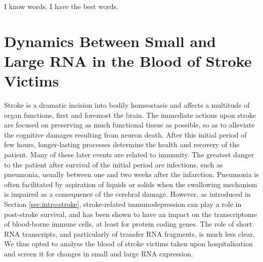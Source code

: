 \newpage\null\pagestyle{plain}\newpage

\pagestyle{fancy}
\fancyhf{}
\renewcommand{\sectionmark}[1]{\markright{#1}} %
\fancyhead[le,ro]{\nouppercase{\rightmark}}
\fancyfoot[le,ro]{\thepage}
\renewcommand{\headrulewidth}{.4pt}
\renewcommand{\footrulewidth}{.4pt}

\begin{savequote}[75mm]
I know words. I have the best words.
\end{savequote}

\chapter[Dynamics Between Small and Large RNA\texorpdfstring{\\}{} in the Blood of Stroke Victims]{Dynamics Between Small and Large RNA in the Blood of Stroke Victims}

Stroke is a dramatic incision into bodily homeostasis and affects a multitude of organ functions, first and foremost the brain. The immediate actions upon stroke are focused on preserving as much functional tissue as possible, so as to alleviate the cognitive damages resulting from neuron death. After this initial period of few hours, longer-lasting processes determine the health and recovery of the patient. Many of these later events are related to immunity. The greatest danger to the patient after survival of the initial period are infections, such as pneumonia, usually between one and two weeks after the infarction. Pneumonia is often facilitated by aspiration of liquids or solids when the swallowing mechanism is impaired as a consequence of the cerebral damage. However, as introduced in Section \ref{sec:intro:stroke}, stroke-related immunodepression can play a role in post-stroke survival, and has been shown to have an impact on the transcriptome of blood-borne immune cells, at least for protein coding genes. The role of short RNA transcripts, and particularly of transfer RNA fragments, is much less clear. We thus opted to analyse the blood of stroke victims taken upon hospitalisation and screen it for changes in small and large RNA expression.

\newpage




